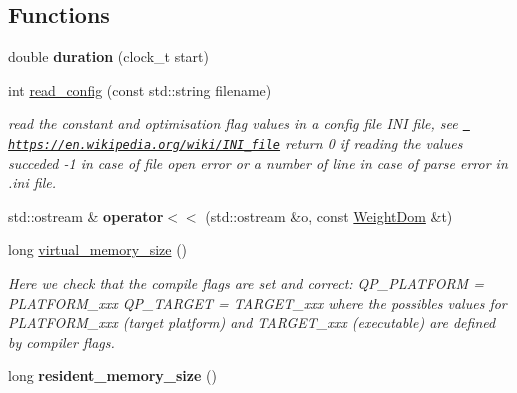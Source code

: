 \subsection*{Functions}
\begin{DoxyCompactItemize}
\item 
\mbox{\label{group__general_ga8ea30422b6f53a4d8e502ab0a1406dff}} 
double {\bfseries duration} (clock\+\_\+t start)
\item 
\mbox{\label{group__general_gaef0eb8293c9f09a03e431fa23dea831d}} 
int \mbox{\hyperlink{group__general_gaef0eb8293c9f09a03e431fa23dea831d}{read\+\_\+config}} (const std\+::string filename)
\begin{DoxyCompactList}\small\item\em read the constant and optimisation flag values in a config file I\+NI file, see \href{https://en.wikipedia.org/wiki/INI_file}{\texttt{ https\+://en.\+wikipedia.\+org/wiki/\+I\+N\+I\+\_\+file}} return 0 if reading the values succeded -\/1 in case of file open error or a number of line in case of parse error in .ini file. \end{DoxyCompactList}\item 
\mbox{\label{group__general_ga7a50522782b1a61b37d5f1b3adceed4a}} 
std\+::ostream \& {\bfseries operator$<$$<$} (std\+::ostream \&o, const \mbox{\hyperlink{group__general_gae07bdce6f4896785ead3b815ca6ab560}{Weight\+Dom}} \&t)
\item 
long \mbox{\hyperlink{group__general_ga3cef5c0e66f31aac9e01e5dfd9f3edc7}{virtual\+\_\+memory\+\_\+size}} ()
\begin{DoxyCompactList}\small\item\em Here we check that the compile flags are set and correct\+: Q\+P\+\_\+\+P\+L\+A\+T\+F\+O\+RM = P\+L\+A\+T\+F\+O\+R\+M\+\_\+xxx Q\+P\+\_\+\+T\+A\+R\+G\+ET = T\+A\+R\+G\+E\+T\+\_\+xxx where the possibles values for P\+L\+A\+T\+F\+O\+R\+M\+\_\+xxx (target platform) and T\+A\+R\+G\+E\+T\+\_\+xxx (executable) are defined by compiler flags. \end{DoxyCompactList}\item 
\mbox{\label{group__general_gab4d9195d8e5dc86aa14c1eea0535d806}} 
long {\bfseries resident\+\_\+memory\+\_\+size} ()
\item 
\mbox{\label{group__general_gaa0f924144ded8d6509d5d349195b00a8}} 

\end{DoxyCompactItemize}
